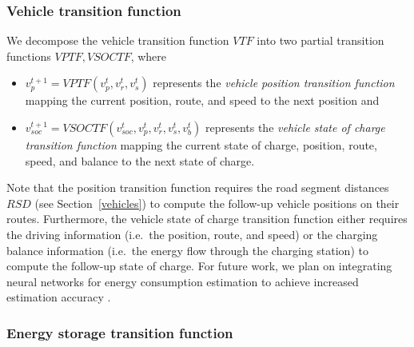 \subsubsection{Vehicle transition function}
\label{transitions_vehicles}

We decompose the vehicle transition function $VTF$ into two partial transition functions $VPTF,VSOCTF$, where
\begin{itemize}
	\item $v_p^{t+1} = VPTF(v_p^t, v_r^t, v_s^t)$ represents the \textit{vehicle position transition function} mapping the current position, route, and speed to the next position and
	\item $v_{soc}^{t+1} = VSOCTF(v_{soc}^t, v_p^t, v_r^t, v_s^t, v_b^t)$ represents the \textit{vehicle state of charge transition function} mapping the current state of charge, position, route, speed, and balance to the next state of charge.
\end{itemize}
Note that the position transition function requires the road segment distances $RSD$ (see Section~\ref{vehicles}) to compute the follow-up vehicle positions on their routes. Furthermore, the vehicle state of charge transition function either requires the driving information (i.e.\ the position, route, and speed) or the charging balance information (i.e.\ the energy flow through the charging station) to compute the follow-up state of charge. For future work, we plan on integrating neural networks for energy consumption estimation to achieve increased estimation accuracy \cite{felipe2015energy}.

\subsubsection{Energy storage transition function}
\label{transitions_storages}

